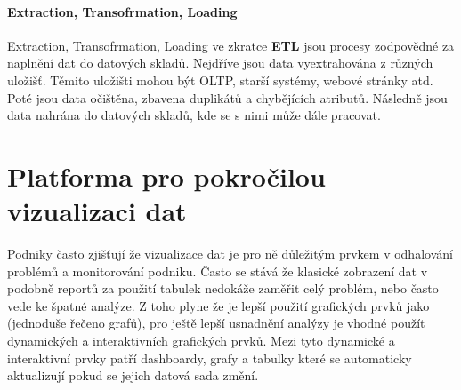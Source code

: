 \paragraph{Extraction, Transofrmation, Loading}
\par Extraction, Transofrmation, Loading ve zkratce \textbf{ETL} jsou procesy zodpovědné za naplnění dat do datových skladů. Nejdříve jsou data vyextrahována z různých uložišť. Těmito uložišti mohou být OLTP, starší systémy, webové stránky atd. Poté jsou data očištěna, zbavena duplikátů a chybějících atributů. Následně jsou data nahrána do datových skladů, kde se s nimi může dále pracovat.


\section{Platforma pro pokročilou vizualizaci dat}
\par Podniky často zjišťují že vizualizace dat je pro ně důležitým prvkem v odhalování problémů a monitorování podniku. Často se stává že klasické zobrazení dat v podobně reportů za použití tabulek nedokáže zaměřit celý problém, nebo často vede ke špatné analýze. Z toho plyne že je lepší použití grafických prvků jako (jednoduše řečeno grafů), pro ještě lepší usnadnění analýzy je vhodné použít dynamických a interaktivních grafických prvků. Mezi tyto dynamické a interaktivní prvky patří dashboardy, grafy a tabulky které se automaticky aktualizují pokud se jejich datová sada změní.

